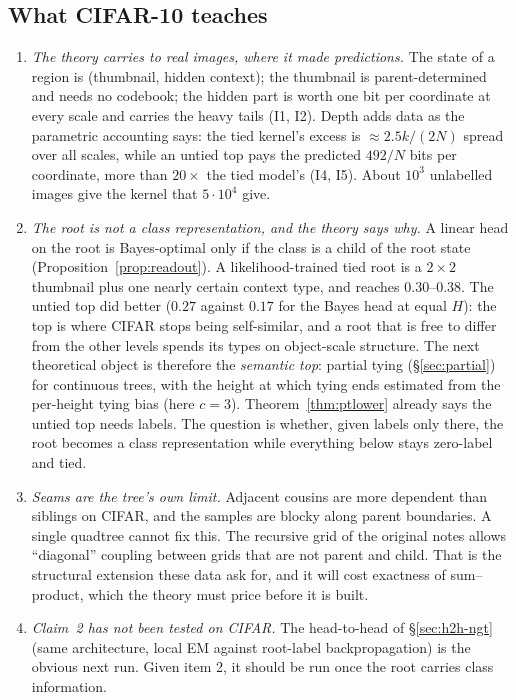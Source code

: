 \documentclass[11pt]{article}
\theoremstyle{definition}
\begin{document}
\subsection{What CIFAR-10 teaches}\label{sec:cifar-lessons}
\begin{enumerate}
\item \emph{The theory carries to real images, where it made predictions.} The state of a region is (thumbnail,
hidden context); the thumbnail is parent-determined and needs no codebook; the hidden part is worth one bit per
coordinate at every scale and carries the heavy tails (I1, I2). Depth adds data as the parametric accounting says:
the tied kernel's excess is $\approx2.5k/(2N)$ spread over all scales, while an untied top pays the predicted $492/N$ bits per
coordinate, more than $20\times$ the tied model's (I4, I5). About $10^3$ unlabelled images give the kernel that $5\cdot10^4$ give.
\item \emph{The root is not a class representation, and the theory says why.} A linear head on the root is Bayes-optimal
only if the class is a child of the root state (Proposition~\ref{prop:readout}). A likelihood-trained tied root is
a $2\times2$ thumbnail plus one nearly certain context type, and reaches $0.30$--$0.38$. The untied top did better
($0.27$ against $0.17$ for the Bayes head at equal $H$): the top is where CIFAR stops being self-similar, and a root
that is free to differ from the other levels spends its types on object-scale structure. The next theoretical
object is therefore the \emph{semantic top}: partial tying (\S\ref{sec:partial}) for continuous trees, with the
height at which tying ends estimated from the per-height tying bias (here $c=3$). Theorem~\ref{thm:ptlower} already
says the untied top needs labels. The question is whether, given labels only there, the root becomes a class
representation while everything below stays zero-label and tied.
\item \emph{Seams are the tree's own limit.} Adjacent cousins are more dependent than siblings on CIFAR, and the samples
are blocky along parent boundaries. A single quadtree cannot fix this. The recursive grid of the original notes
allows ``diagonal'' coupling between grids that are not parent and child. That is the structural extension these
data ask for, and it will cost exactness of sum--product, which the theory must price before it is built.
\item \emph{Claim~2 has not been tested on CIFAR.} The head-to-head of \S\ref{sec:h2h-ngt} (same architecture, local EM
against root-label backpropagation) is the obvious next run. Given item 2, it should be run once the root carries
class information.
\end{enumerate}
\end{document}
